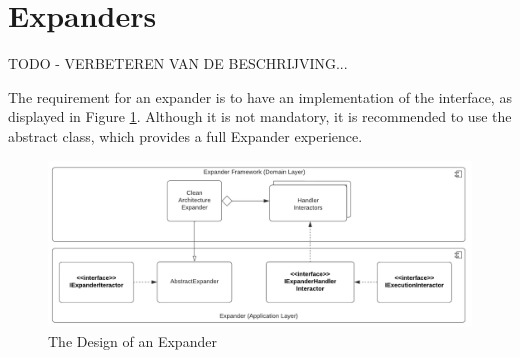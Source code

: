 \section{Expanders}

TODO - VERBETEREN VAN DE BESCHRIJVING...

The requirement for an expander is to have an implementation of the
 interface, as displayed in Figure
\ref{fig_expander_design}. Although it is not mandatory, it is recommended to use the
abstract  class, which provides a full Expander
experience.

\begin{figure}[H]
    \centering
    \includegraphics[width=1\textwidth]{figures/expander.pdf}
    \caption[The Design of an Expander]{The Design of an Expander}
    \label{fig_expander_design}
  \end{figure}